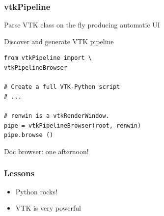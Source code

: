 \begin{frame}
    \frametitle{vtkPipeline}
    \Large
    \begin{center}
    Parse VTK class on the fly producing automatic UI

    \vspace{1in}
    \pause
    Discover and generate VTK pipeline

    \end{center}
\end{frame}

\begin{frame}[fragile]
\vspace*{-6pt}
\normalsize
\begin{lstlisting}
from vtkPipeline import \
vtkPipelineBrowser

# Create a full VTK-Python script
# ...

# renwin is a vtkRenderWindow.
pipe = vtkPipelineBrowser(root, renwin)
pipe.browse ()
\end{lstlisting}
\end{frame}

\begin{frame}
    \Large
    \vspace*{-0.15in}
    \begin{center}
    \end{center}
\end{frame}

\begin{frame}
    \Large
    \vspace*{-0.15in}
    \begin{center}
    \end{center}
\end{frame}

\begin{frame}
    \Large
    \begin{center}
    Doc browser: one afternoon!
    \end{center}
\end{frame}


\begin{frame}
    \frametitle{Lessons}
    \Large
    \begin{itemize}
        \item Python rocks!
        \item VTK is very powerful
    \end{itemize}
\end{frame}


